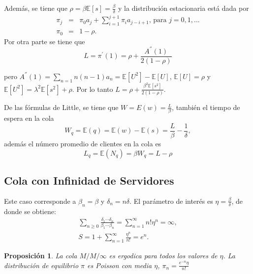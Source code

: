\documentclass{article}
\newtheorem{Prop}{Proposición}
\newcommand{\esp}{\mathbb{E}}
\begin{document}
Adem\'as, se tiene que $\rho=\beta\esp\left[s\right]=\frac{\beta}{\delta}$ y la distribuci\'on estacionaria est\'a dada por
\begin{eqnarray}
\pi_{j}&=&\pi_{0}a_{j}+\sum_{i=1}^{j+1}\pi_{i}a_{j-i+1}\textrm{, para }j=0,1,\ldots\\
\pi_{0}&=&1-\rho.
\end{eqnarray}
Por otra parte se tiene que\begin{equation}
L=\pi^{'}\left(1\right)=\rho+\frac{A^{''}\left(1\right)}{2\left(1-\rho\right)}
\end{equation}

pero $A^{''}\left(1\right)=\sum_{n=1}n\left(n-1\right)a_{n}= \esp\left[U^{2}\right]-\esp\left[U\right]$, $\esp\left[U\right]=\rho$ y
$\esp\left[U^{2}\right]=\lambda^{2}\esp\left[s^{2}\right]+\rho$.
Por lo tanto $L=\rho+\frac{\beta^{2}\esp\left[s^{2}\right]}{2\left(1-\rho\right)}$.

De las f\'ormulas de Little, se tiene que $W=E\left(w\right)=\frac{L}{\beta}$, tambi\'en el tiempo de espera en la cola
\begin{equation}
W_{q}=\esp\left(q\right)=\esp\left(w\right)-\esp\left(s\right)=\frac{L}{\beta}-\frac{1}{\delta},
\end{equation}
adem\'as el n\'umero promedio de clientes en la cola es
\begin{equation}
L_{q}=\esp\left(N_{q}\right)=\beta W_{q}=L-\rho
\end{equation}


\subsection{Cola con Infinidad de Servidores}

Este caso corresponde a $\beta_{n}=\beta$ y $\delta_{n}=n\delta$. El par\'ametro de inter\'es es $\eta=\frac{\beta}{\delta}$, de donde se obtiene:
\begin{eqnarray*}
\sum_{n\geq0}\frac{\delta_{1}\cdots\delta_{n}}{\beta_{1}\cdots\beta_{n}}=\sum_{n=1}^{\infty}n!\eta^{n}=\infty,\\
S=1+\sum_{n=1}^{\infty}\frac{\eta^{n}}{n!}=e^{n}.
\end{eqnarray*}

\begin{Prop}
La cola $M/M/\infty$ es ergodica para todos los valores de $\eta$. La distribuci\'on de equilibrio $\pi$ es Poisson con media $\eta$, $\pi_{n}=\frac{e^{-n}\eta}{n!}$
\end{Prop}
\end{document}

